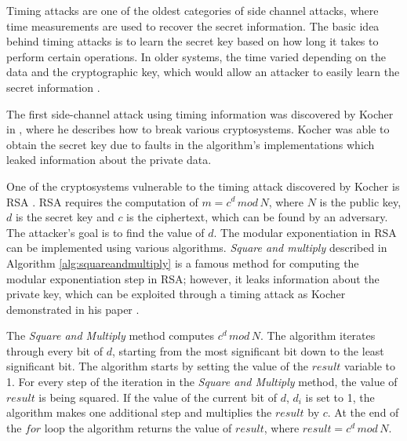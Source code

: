 \documentclass[10pt,a4paper,twoside]{book}
\begin{document}
Timing attacks are one of the oldest categories of side channel attacks, where time measurements are used to recover the secret information. The basic idea behind timing attacks is to learn the secret key based on how long it takes to perform certain operations. In older systems, the time varied depending on the data and the cryptographic key, which would allow an attacker to easily learn the secret information \cite{Koeune2011}.

The first side-channel attack using timing information was discovered by Kocher in \cite{kocher1996timing}, where he describes how to break various cryptosystems. Kocher was able to obtain the secret key due to faults in the algorithm's implementations which leaked information about the private data.


One of the cryptosystems vulnerable to the timing attack discovered by Kocher \cite{kocher1996timing} is RSA \cite{rivest1978method}. RSA requires the computation of $m = c^d \, mod \, N$, where $N$ is the public key, $d$ is the secret key and $c$ is the ciphertext, which can be found by an adversary. The attacker's goal is to find the value of $d$. The modular exponentiation in RSA can be implemented using various algorithms. \textit{Square and multiply} described in Algorithm \ref{alg:squareandmultiply} is a famous method for computing the modular exponentiation step in RSA; however, it leaks information about the private key, which can be exploited through a timing attack as Kocher demonstrated in his paper \cite{kocher1996timing}.

The \textit{Square and Multiply} method computes $c^d \, mod \, N$. The algorithm iterates through every bit of $d$, starting from the most significant bit down to the least significant bit. The algorithm starts by setting the value of the $result$ variable to 1. For every step of the iteration in the \textit{Square and Multiply} method, the value of $result$ is being squared. If the value of the current bit of $d$, $d_i$ is set to 1, the algorithm makes one additional step and multiplies the $result$ by $c$. At the end of the $for$ loop the algorithm returns the value of $result$, where $result = c^d \, mod \, N$.
\end{document}
